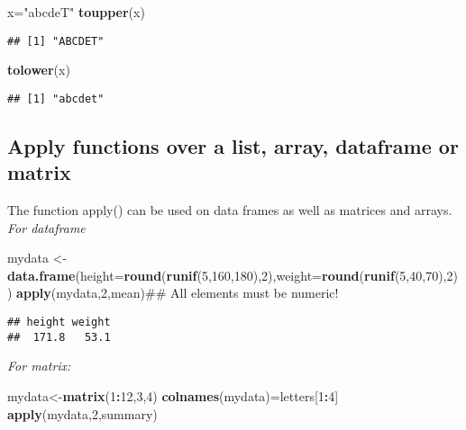 \documentclass[]{book}
\newenvironment{Shaded}{\begin{snugshade}}{\end{snugshade}}
\newcommand{\KeywordTok}[1]{\textcolor[rgb]{0.13,0.29,0.53}{\textbf{#1}}}
\newcommand{\DataTypeTok}[1]{\textcolor[rgb]{0.13,0.29,0.53}{#1}}
\newcommand{\DecValTok}[1]{\textcolor[rgb]{0.00,0.00,0.81}{#1}}
\newcommand{\StringTok}[1]{\textcolor[rgb]{0.31,0.60,0.02}{#1}}
\newcommand{\OperatorTok}[1]{\textcolor[rgb]{0.81,0.36,0.00}{\textbf{#1}}}
\newcommand{\NormalTok}[1]{#1}
\theoremstyle{definition}
\theoremstyle{definition}
\theoremstyle{definition}
\theoremstyle{remark}
\begin{document}
\begin{Shaded}
\begin{Highlighting}[]
\NormalTok{x=}\StringTok{"abcdeT"}
\KeywordTok{toupper}\NormalTok{(x)}
\end{Highlighting}
\end{Shaded}

\begin{verbatim}
## [1] "ABCDET"
\end{verbatim}

\begin{Shaded}
\begin{Highlighting}[]
\KeywordTok{tolower}\NormalTok{(x)}
\end{Highlighting}
\end{Shaded}

\begin{verbatim}
## [1] "abcdet"
\end{verbatim}

\subsection{Apply functions over a list, array, dataframe or
matrix}\label{apply-functions-over-a-list-array-dataframe-or-matrix}

The function apply() can be used on data frames as well as matrices and
arrays. \emph{For dataframe}

\begin{Shaded}
\begin{Highlighting}[]
\NormalTok{mydata <-}\StringTok{ }\KeywordTok{data.frame}\NormalTok{(}\DataTypeTok{height=}\KeywordTok{round}\NormalTok{(}\KeywordTok{runif}\NormalTok{(}\DecValTok{5}\NormalTok{,}\DecValTok{160}\NormalTok{,}\DecValTok{180}\NormalTok{),}\DecValTok{2}\NormalTok{),}\DataTypeTok{weight=}\KeywordTok{round}\NormalTok{(}\KeywordTok{runif}\NormalTok{(}\DecValTok{5}\NormalTok{,}\DecValTok{40}\NormalTok{,}\DecValTok{70}\NormalTok{),}\DecValTok{2}\NormalTok{))}
\KeywordTok{apply}\NormalTok{(mydata,}\DecValTok{2}\NormalTok{,mean)## All elements must be numeric!}
\end{Highlighting}
\end{Shaded}

\begin{verbatim}
## height weight 
##  171.8   53.1
\end{verbatim}

\emph{For matrix:}

\begin{Shaded}
\begin{Highlighting}[]
\NormalTok{mydata<-}\KeywordTok{matrix}\NormalTok{(}\DecValTok{1}\OperatorTok{:}\DecValTok{12}\NormalTok{,}\DecValTok{3}\NormalTok{,}\DecValTok{4}\NormalTok{)}
\KeywordTok{colnames}\NormalTok{(mydata)=letters[}\DecValTok{1}\OperatorTok{:}\DecValTok{4}\NormalTok{]}
\KeywordTok{apply}\NormalTok{(mydata,}\DecValTok{2}\NormalTok{,summary)}
\end{Highlighting}
\end{Shaded}
\end{document}
